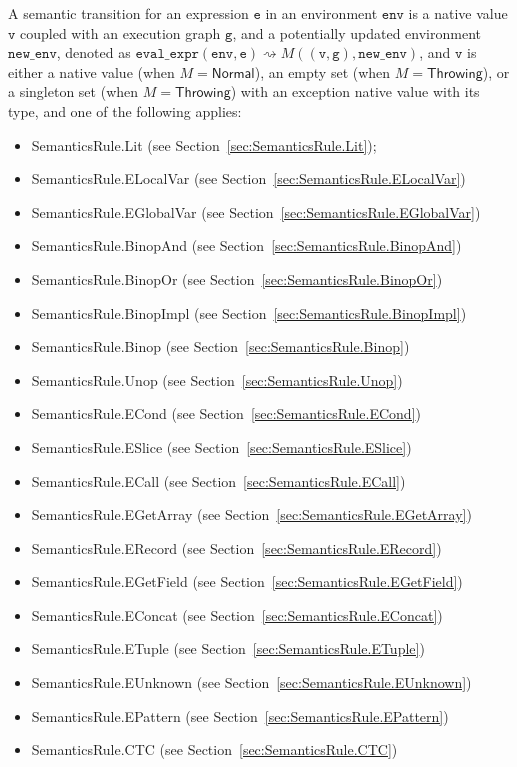 \documentclass{book}
\newcommand\evalarrow[0]{\rightsquigarrow}
\newcommand\evalexpr[1]{\texttt{eval\_expr}(#1)}
\newcommand\Normal[0]{\textsf{Normal}}
\newcommand\Throwing[0]{\textsf{Throwing}}
\newcommand\newenv[0]{\texttt{new\_env}}
\newcommand\env[0]{\texttt{env}}
\newcommand\ve[0]{\texttt{e}}
\newcommand\vg[0]{\texttt{g}}
\newcommand\vv[0]{\texttt{v}}
\begin{document}
A semantic transition for an expression $\ve$ in an environment $\env$ is
a native value $\vv$ coupled with an execution graph $\vg$,
and a potentially updated environment $\newenv$,
denoted as $\evalexpr{\env, \ve} \evalarrow M((\vv, \vg), \newenv)$,
and $\vv$ is either a native value (when $M=\Normal$), an empty set (when $M=\Throwing$), or a singleton set (when $M=\Throwing$)
with an exception native value with its type, and one of the following applies:
\begin{itemize}
\item SemanticsRule.Lit (see Section~\ref{sec:SemanticsRule.Lit});
\item SemanticsRule.ELocalVar (see Section~\ref{sec:SemanticsRule.ELocalVar})
\item SemanticsRule.EGlobalVar (see Section~\ref{sec:SemanticsRule.EGlobalVar})
\item SemanticsRule.BinopAnd (see Section~\ref{sec:SemanticsRule.BinopAnd})
\item SemanticsRule.BinopOr (see Section~\ref{sec:SemanticsRule.BinopOr})
\item SemanticsRule.BinopImpl (see Section~\ref{sec:SemanticsRule.BinopImpl})
\item SemanticsRule.Binop (see Section~\ref{sec:SemanticsRule.Binop})
\item SemanticsRule.Unop (see Section~\ref{sec:SemanticsRule.Unop})
\item SemanticsRule.ECond (see Section~\ref{sec:SemanticsRule.ECond})
\item SemanticsRule.ESlice (see Section~\ref{sec:SemanticsRule.ESlice})
\item SemanticsRule.ECall (see Section~\ref{sec:SemanticsRule.ECall})
\item SemanticsRule.EGetArray (see Section~\ref{sec:SemanticsRule.EGetArray})
\item SemanticsRule.ERecord (see Section~\ref{sec:SemanticsRule.ERecord})
\item SemanticsRule.EGetField (see Section~\ref{sec:SemanticsRule.EGetField})
\item SemanticsRule.EConcat (see Section~\ref{sec:SemanticsRule.EConcat})
\item SemanticsRule.ETuple (see Section~\ref{sec:SemanticsRule.ETuple})
\item SemanticsRule.EUnknown (see Section~\ref{sec:SemanticsRule.EUnknown})
\item SemanticsRule.EPattern (see Section~\ref{sec:SemanticsRule.EPattern})
\item SemanticsRule.CTC (see Section~\ref{sec:SemanticsRule.CTC})
\end{itemize}
\end{document}
